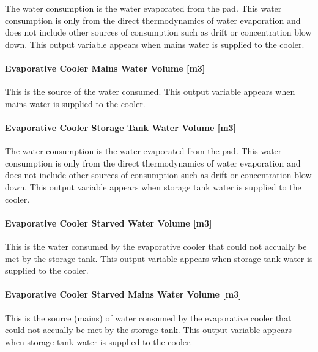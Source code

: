 The water consumption is the water evaporated from the pad. This water consumption is only from the direct thermodynamics of water evaporation and does not include other sources of consumption such as drift or concentration blow down. This output variable appears when mains water is supplied to the cooler.

\paragraph{Evaporative Cooler Mains Water Volume {[}m3{]}}\label{evaporative-cooler-mains-water-volume-m3-3}

This is the source of the water consumed. This output variable appears when mains water is supplied to the cooler.

\paragraph{Evaporative Cooler Storage Tank Water Volume {[}m3{]}}\label{evaporative-cooler-storage-tank-water-volume-m3-3}

The water consumption is the water evaporated from the pad. This water consumption is only from the direct thermodynamics of water evaporation and does not include other sources of consumption such as drift or concentration blow down. This output variable appears when storage tank water is supplied to the cooler.

\paragraph{Evaporative Cooler Starved Water Volume {[}m3{]}}\label{evaporative-cooler-starved-water-volume-m3-3}

This is the water consumed by the evaporative cooler that could not accually be met by the storage tank. This output variable appears when storage tank water is supplied to the cooler.

\paragraph{Evaporative Cooler Starved Mains Water Volume {[}m3{]}}\label{evaporative-cooler-starved-mains-water-volume-m3-3}

This is the source (mains) of water consumed by the evaporative cooler that could not accually be met by the storage tank. This output variable appears when storage tank water is supplied to the cooler.

